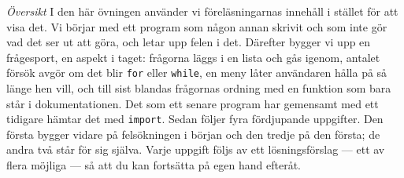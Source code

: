 %

\emph{Översikt}
I den här övningen använder vi föreläsningarnas innehåll i stället för
att visa det.  Vi börjar med ett program som någon annan skrivit och som
inte gör vad det ser ut att göra, och letar upp felen i det.  Därefter
bygger vi upp en frågesport, en aspekt i taget: frågorna läggs i en
lista och gås igenom, antalet försök avgör om det blir
\texttt{for} eller \texttt{while}, en meny låter
användaren hålla på så länge hen vill, och till sist blandas frågornas
ordning med en funktion som bara står i dokumentationen.  Det som ett
senare program har gemensamt med ett tidigare hämtar det med
\texttt{import}.  Sedan följer fyra
fördjupande uppgifter.  Den första bygger vidare på felsökningen i
början och den tredje på den första; de andra två står för sig själva.
Varje uppgift följs av ett lösningsförslag --- ett av flera möjliga ---
så att du kan fortsätta på egen hand efteråt.

